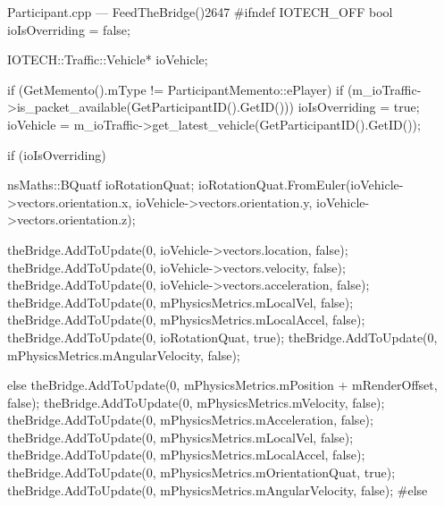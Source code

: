 \begin{codelist}{Participant.cpp --- FeedTheBridge()}{2647}
#ifndef IOTECH_OFF
	bool ioIsOverriding = false;

	IOTECH::Traffic::Vehicle* ioVehicle;

	if (GetMemento().mType != ParticipantMemento::ePlayer) {
		if (m_ioTraffic->is_packet_available(GetParticipantID().GetID())) {
			ioIsOverriding = true;
			ioVehicle = m_ioTraffic->get_latest_vehicle(GetParticipantID().GetID());
		}
	}

	if (ioIsOverriding) {
		nsMaths::BQuatf ioRotationQuat;
		ioRotationQuat.FromEuler(ioVehicle->vectors.orientation.x, ioVehicle->vectors.orientation.y, ioVehicle->vectors.orientation.z);

		theBridge.AddToUpdate(0, ioVehicle->vectors.location, false);
		theBridge.AddToUpdate(0, ioVehicle->vectors.velocity, false);
		theBridge.AddToUpdate(0, ioVehicle->vectors.acceleration, false);
		theBridge.AddToUpdate(0, mPhysicsMetrics.mLocalVel, false);
		theBridge.AddToUpdate(0, mPhysicsMetrics.mLocalAccel, false);
		theBridge.AddToUpdate(0, ioRotationQuat, true);
		theBridge.AddToUpdate(0, mPhysicsMetrics.mAngularVelocity, false);
	}
	else {
		theBridge.AddToUpdate(0, mPhysicsMetrics.mPosition + mRenderOffset, false);
		theBridge.AddToUpdate(0, mPhysicsMetrics.mVelocity, false);
		theBridge.AddToUpdate(0, mPhysicsMetrics.mAcceleration, false);
		theBridge.AddToUpdate(0, mPhysicsMetrics.mLocalVel, false);
		theBridge.AddToUpdate(0, mPhysicsMetrics.mLocalAccel, false);
		theBridge.AddToUpdate(0, mPhysicsMetrics.mOrientationQuat, true);
		theBridge.AddToUpdate(0, mPhysicsMetrics.mAngularVelocity, false);
	}
#else
\end{codelist}

